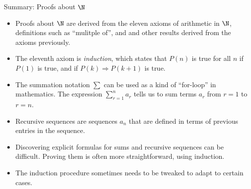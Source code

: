 \documentclass[11pt,aspectratio=1610,handout]{beamer}
\begin{document}
\begin{frame}{Summary: Proofs about $\N$}
	\begin{itemize}
		\item Proofs about $\N$ are derived from the eleven axioms of arithmetic in $\N$, definitions such as ``mulitple of'', and and other results derived from the axioms previously. \p 
		
		\item The eleventh axiom is \emph{induction}, which states that $P(n)$ is true for all $n$ if $P(1)$ is true, and if $P(k) \Rightarrow P(k+1)$ is true. \p
		
		\item The summation notation $\sum$ can be used as a kind of ``for-loop'' in mathematics. The expression $\displaystyle \sum_{r=1}^n a_r$ tells us to sum terms $a_r$ from $r=1$ to $r=n$.  \p
		\item Recursive sequences are sequences $a_n$ that are defined in terms of previous entries in the sequence. \p
		
		\item Discovering explicit formulas for sums and recursive sequences can be difficult. Proving them is often more straightforward, using induction. \p
		
		\item The induction procedure sometimes needs to be tweaked to adapt to certain cases. 
	\end{itemize}
\end{frame}
\end{document}
